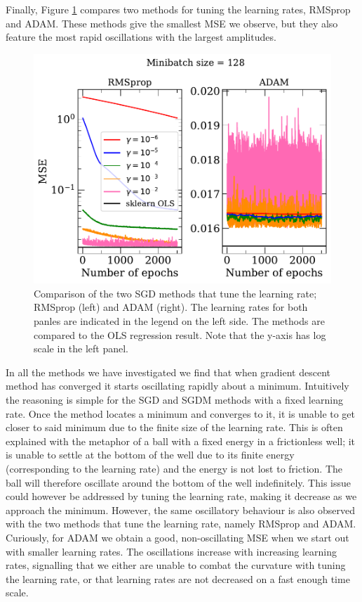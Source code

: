\documentclass[a4paper, 
amsfonts, 
amssymb, 
amsmath, 
reprint, 
showkeys, 
nofootinbib, 
twoside]{revtex4-2}
\begin{document}
Finally, Figure \ref{fig:tunerates} compares two methods for tuning the learning rates, RMSprop and ADAM. These methods give the smallest MSE we observe, but they also feature the most rapid oscillations with the largest amplitudes.

\begin{figure}
    \centering
    \includegraphics[width = \columnwidth]{Figures/tunerates_1.pdf}
    \caption{Comparison of the two SGD methods that tune the learning rate; RMSprop (left) and ADAM (right). The learning rates for both panles are indicated in the legend on the left side. The methods are compared to the OLS regression result. Note that the y-axis has log scale in the left panel.}
    \label{fig:tunerates}
\end{figure}

In all the methods we have investigated we find that when gradient descent method has converged it starts oscillating rapidly about a minimum. Intuitively the reasoning is simple for the SGD and SGDM methods with a fixed learning rate. Once the method locates a minimum and converges to it, it is unable to get closer to said minimum due to the finite size of the learning rate. This is often explained with the metaphor of a ball with a fixed energy in a frictionless well; it is unable to settle at the bottom of the well due to its finite energy (corresponding to the learning rate) and the energy is not lost to friction. The ball will therefore oscillate around the bottom of the well indefinitely. This issue could however be addressed by tuning the learning rate, making it decrease as we approach the minimum. However, the same oscillatory behaviour is also observed with the two methods that tune the learning rate, namely RMSprop and ADAM. Curiously, for ADAM we obtain a good, non-oscillating MSE when we start out with smaller learning rates. The oscillations increase with increasing learning rates, signalling that we either are unable to combat the curvature with tuning the learning rate, or that learning rates are not decreased on a fast enough time scale. 
\end{document}

